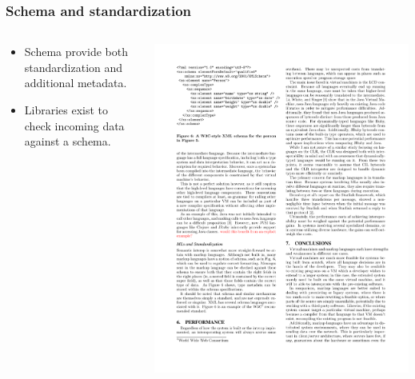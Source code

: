 \documentclass{beamer}
\begin{document}
 \begin{frame}
  \frametitle{Schema and standardization}
  \begin{columns}
  \begin{column}{0.5\textwidth}
  \begin{itemize}
  \item Schema provide both standardization and additional metadata.
  \item Libraries exist to check incoming data against a schema.
  \end{itemize}
  \end{column}
  
  \begin{column}{0.66\textwidth}  
  \includegraphics[scale=0.8]{graphics/XMLSchemaW3C.pdf}
  \end{column}
  \end{columns}
 \end{frame}
\end{document}
